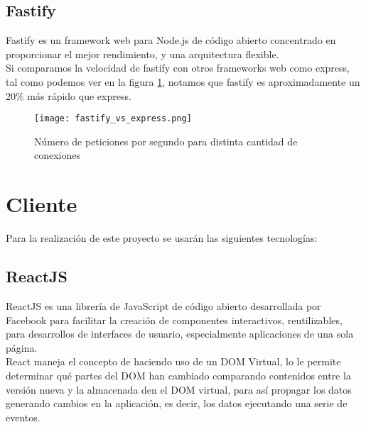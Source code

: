 \iffalse 
    \begin{figure}
        \texttt{[image: mongodb-structure.jpg]}
        \caption{Comparación de estructura de datos entre MongoDB y los RDBMS (sistema de gestión de bases de datos relacionales)}
    \end{figure}
\fi

\subsection{Fastify}

Fastify es un framework web para Node.js de código abierto concentrado en proporcionar el mejor rendimiento, y una arquitectura flexible. \\

Si comparamos la velocidad de fastify con otros frameworks web como express, tal como podemos ver en la figura \ref{fig:fastify_vs_express}, notamos que fastify es aproximadamente un 20\% más rápido que express. \\

\begin{figure}
    \texttt{[image: fastify\_vs\_express.png]}
    \caption{ Número de peticiones por segundo para distinta cantidad de conexiones}
    \label{fig:fastify_vs_express}
\end{figure}


\section{Cliente}

    Para la realización de este proyecto se usarán las siguientes tecnologías:

    \subsection{ReactJS}

        ReactJS es una librería de JavaScript de código abierto desarrollada por Facebook para facilitar la creación de componentes interactivos, reutilizables, para desarrollos de interfaces de usuario, especialmente aplicaciones de una sola página.\\

        React maneja el concepto de  haciendo uso de un DOM Virtual, lo le permite determinar qué partes del DOM han cambiado comparando contenidos entre la versión nueva y la almacenada den el DOM virtual, para así propagar los datos generando cambios en la aplicación, es decir, los datos  ejecutando una serie de eventos.\\

